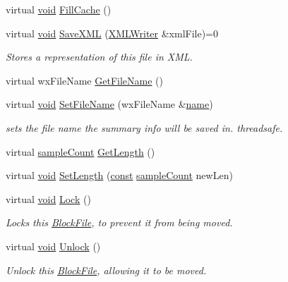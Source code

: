 \begin{DoxyCompactItemize}
\item 
virtual \hyperlink{sound_8c_ae35f5844602719cf66324f4de2a658b3}{void} \hyperlink{class_block_file_aa228bcd50e100ba28031dece974b73a8}{Fill\+Cache} ()
\item 
virtual \hyperlink{sound_8c_ae35f5844602719cf66324f4de2a658b3}{void} \hyperlink{class_block_file_a62527189fe371325e23f3802f20282f8}{Save\+X\+ML} (\hyperlink{class_x_m_l_writer}{X\+M\+L\+Writer} \&xml\+File)=0
\begin{DoxyCompactList}\small\item\em Stores a representation of this file in X\+ML. \end{DoxyCompactList}\item 
virtual wx\+File\+Name \hyperlink{class_block_file_a07fa90d9e26b0f5c4bc76716aff0fa87}{Get\+File\+Name} ()
\item 
virtual \hyperlink{sound_8c_ae35f5844602719cf66324f4de2a658b3}{void} \hyperlink{class_block_file_a3d4e44c3aacfcaa78e23c8868e8c3760}{Set\+File\+Name} (wx\+File\+Name \&\hyperlink{lib_2expat_8h_a1b49b495b59f9e73205b69ad1a2965b0}{name})
\begin{DoxyCompactList}\small\item\em sets the file name the summary info will be saved in. threadsafe. \end{DoxyCompactList}\item 
virtual \hyperlink{include_2audacity_2_types_8h_afa427e1f521ea5ec12d054e8bd4d0f71}{sample\+Count} \hyperlink{class_block_file_a93fa23bb9606cafba976f2c0b818719c}{Get\+Length} ()
\item 
virtual \hyperlink{sound_8c_ae35f5844602719cf66324f4de2a658b3}{void} \hyperlink{class_block_file_a9a6903a5c87598f8dc92041351a271d8}{Set\+Length} (\hyperlink{getopt1_8c_a2c212835823e3c54a8ab6d95c652660e}{const} \hyperlink{include_2audacity_2_types_8h_afa427e1f521ea5ec12d054e8bd4d0f71}{sample\+Count} new\+Len)
\item 
virtual \hyperlink{sound_8c_ae35f5844602719cf66324f4de2a658b3}{void} \hyperlink{class_block_file_a5380b2450594af576dfd122cad12be1c}{Lock} ()
\begin{DoxyCompactList}\small\item\em Locks this \hyperlink{class_block_file}{Block\+File}, to prevent it from being moved. \end{DoxyCompactList}\item 
virtual \hyperlink{sound_8c_ae35f5844602719cf66324f4de2a658b3}{void} \hyperlink{class_block_file_addbc143efdfd7f74a7c6beed6023745f}{Unlock} ()
\begin{DoxyCompactList}\small\item\em Unlock this \hyperlink{class_block_file}{Block\+File}, allowing it to be moved. \end{DoxyCompactList}\item 

\end{DoxyCompactItemize}
